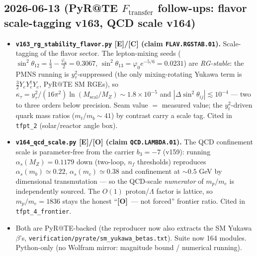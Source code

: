 \documentclass[11pt]{article}
\providecommand{\mE}{\textbf{[E]}}\providecommand{\mC}{\textbf{[C]}}
\providecommand{\mO}{\textbf{[O]}}\providecommand{\mX}{\textbf{[X]}}
\begin{document}
\subsection*{2026-06-13 (PyR@TE $F_{\mathrm{transfer}}$ follow-ups: flavor scale-tagging v163, QCD scale v164)}
\begin{itemize}
\item \textbf{\texttt{v163\_rg\_stability\_flavor.py} \mE/\mC{} (claim \texttt{FLAV.RGSTAB.01}).}
  Scale-tagging of the flavor sector. The lepton-mixing seeds
  ($\sin^2\theta_{12}=\tfrac13-\tfrac{\varphi_0}{2}=0.3067$,
  $\sin^2\theta_{13}=\varphi_0 e^{-5/6}=0.0231$) are \emph{RG-stable}: the PMNS
  running is $y_\tau^2$-suppressed (the only mixing-rotating Yukawa term is
  $\tfrac32 Y_e Y_e^\dagger Y_e$, PyR@TE SM RGEs), so
  $\kappa_\tau=y_\tau^2/(16\pi^2)\ln(M_{\mathrm{scal}}/M_Z)\sim1.8\times10^{-5}$ and
  $|\Delta\sin^2\theta_{ij}|\lesssim10^{-4}$ --- two to three orders below precision.
  Seam value $=$ measured value; the $y_t^2$-driven quark mass ratios ($m_t/m_b\sim41$)
  by contrast carry a scale tag. Cited in \texttt{tfpt\_2} (solar/reactor angle box).
\item \textbf{\texttt{v164\_qcd\_scale.py} \mE/\mO{} (claim \texttt{QCD.LAMBDA.01}).}
  The QCD confinement scale is parameter-free from the carrier $b_3=-7$ (v159):
  running $\alpha_s(M_Z)=0.1179$ down (two-loop, $n_f$ thresholds) reproduces
  $\alpha_s(m_b)\simeq0.22$, $\alpha_s(m_c)\simeq0.38$ and confinement at
  $\sim0.5$ GeV by dimensional transmutation --- so the QCD-scale \emph{numerator} of
  $m_p/m_e$ is independently sourced. The $O(1)$ proton/$\Lambda$ factor is lattice, so
  $m_p/m_e=1836$ stays the honest ``\mO\ --- not forced'' frontier ratio. Cited in
  \texttt{tfpt\_4\_frontier}.
\item Both are PyR@TE-backed (the reproducer now also extracts the SM Yukawa $\beta$'s,
  \texttt{verification/pyrate/sm\_yukawa\_betas.txt}). Suite now 164 modules. Python-only
  (no Wolfram mirror: magnitude bound / numerical running).
\end{itemize}
\end{document}
